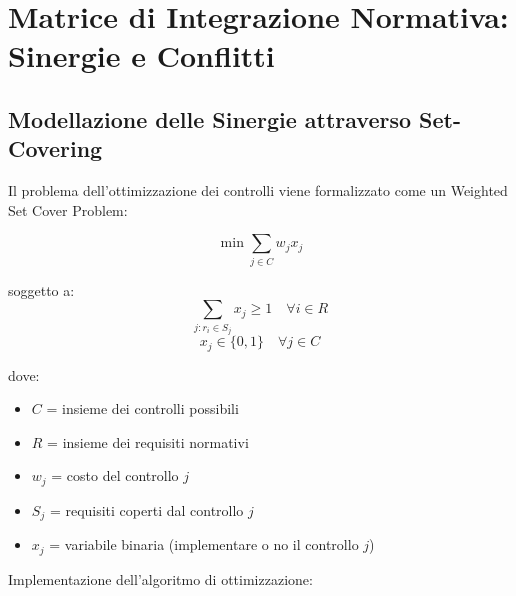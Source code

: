 \section{Matrice di Integrazione Normativa: Sinergie e Conflitti}

\subsection{Modellazione delle Sinergie attraverso Set-Covering}

Il problema dell'ottimizzazione dei controlli viene formalizzato come un Weighted Set Cover Problem:

\begin{equation}
\min \sum_{j \in C} w_j x_j
\end{equation}

soggetto a: 
\begin{equation}
\sum_{j: r_i \in S_j} x_j \geq 1 \quad \forall i \in R
\end{equation}
\begin{equation}
x_j \in \{0,1\} \quad \forall j \in C
\end{equation}

dove:
\begin{itemize}
\item $C$ = insieme dei controlli possibili
\item $R$ = insieme dei requisiti normativi
\item $w_j$ = costo del controllo $j$
\item $S_j$ = requisiti coperti dal controllo $j$
\item $x_j$ = variabile binaria (implementare o no il controllo $j$)
\end{itemize}

Implementazione dell'algoritmo di ottimizzazione:

